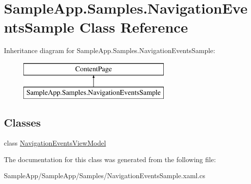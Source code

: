 \hypertarget{class_sample_app_1_1_samples_1_1_navigation_events_sample}{}\section{Sample\+App.\+Samples.\+Navigation\+Events\+Sample Class Reference}
\label{class_sample_app_1_1_samples_1_1_navigation_events_sample}
Inheritance diagram for Sample\+App.\+Samples.\+Navigation\+Events\+Sample\+:\begin{figure}[H]
\begin{center}
\leavevmode
\includegraphics[height=2.000000cm]{class_sample_app_1_1_samples_1_1_navigation_events_sample}
\end{center}
\end{figure}
\subsection*{Classes}
\begin{DoxyCompactItemize}
\item 
class \hyperlink{class_sample_app_1_1_samples_1_1_navigation_events_sample_1_1_navigation_events_view_model}{Navigation\+Events\+View\+Model}
\end{DoxyCompactItemize}


The documentation for this class was generated from the following file\+:\begin{DoxyCompactItemize}
\item 
Sample\+App/\+Sample\+App/\+Samples/Navigation\+Events\+Sample.\+xaml.\+cs\end{DoxyCompactItemize}
